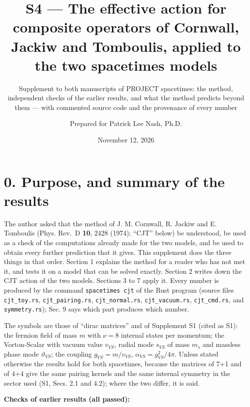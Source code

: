 \documentclass[
  10pt,
]{article}
\title{S4 --- The effective action for composite operators of Cornwall,
Jackiw and Tomboulis, applied to the two spacetimes models}
\subtitle{Supplement to both manuscripts of PROJECT spacetimes: the
method, independent checks of the earlier results, and what the method
predicts beyond them --- with commented source code and the provenance
of every number}
\author{Prepared for Patrick Lee Nash, Ph.D.}
\date{November 12, 2026}
\begin{document}
\maketitle

\hypertarget{purpose-and-summary-of-the-results}{%
\section{0. Purpose, and summary of the
results}\label{purpose-and-summary-of-the-results}}

The author asked that the method of J. M. Cornwall, R. Jackiw and E.
Tomboulis (Phys. Rev.~D \textbf{10}, 2428 (1974); ``CJT'' below) be
understood, be used as a check of the computations already made for the
two models, and be used to obtain every further prediction that it
gives. This supplement does the three things in that order. Section 1
explains the method for a reader who has not met it, and tests it on a
model that can be solved exactly. Section 2 writes down the CJT action
of the two models. Sections 3 to 7 apply it. Every number is produced by
the command \texttt{spacetimes\ cjt} of the Rust program (source files
\texttt{cjt\_toy.rs}, \texttt{cjt\_pairing.rs}, \texttt{cjt\_normal.rs},
\texttt{cjt\_vacuum.rs}, \texttt{cjt\_cmd.rs}, and
\texttt{symmetry.rs}); Sec. 9 says which part produces which number.

The symbols are those of ``dirac matrices'' and of Supplement S1 (cited
as S1): the fermion field of mass \(m\) with \(\nu=8\) internal states
per momentum; the Vorton-Scalar with vacuum value \(v_{VS}\), radial
mode \(s_{VS}\) of mass \(m_s\) and massless phase mode
\(\vartheta_{VS}\); the coupling \(g_{VS}=m/v_{VS}\),
\(\alpha_{VS}=g_{VS}^2/4\pi\). Unless stated otherwise the results hold
for both spacetimes, because the matrices of 7+1 and of 4+4 give the
same pairing kernels and the same internal symmetry in the sector used
(S1, Secs. 2.1 and 4.2); where the two differ, it is said.

\textbf{Checks of earlier results (all passed):}
\end{document}

